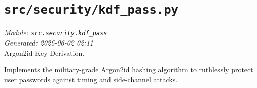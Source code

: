 
\section{\texttt{src/security/kdf\_pass.py}}
\textit{Module: \texttt{src.security.kdf\_pass}} \\
\textit{Generated: 2026-06-02 02:11} \\

Argon2id Key Derivation.

Implements the military-grade Argon2id hashing algorithm to ruthlessly
protect user passwords against timing and side-channel attacks.
